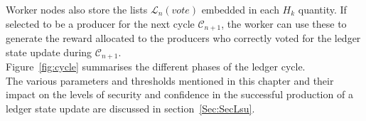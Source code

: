 Worker nodes also store the lists $\mathcal{L}_{n}(vote)$ embedded in each $H_k$ quantity. If selected to be a producer for the next cycle $\mathcal{C}_{n+1}$, the worker can use these to generate the reward allocated to the producers who correctly voted for the ledger state update during $\mathcal{C}_{n+1}$.\\

Figure~\ref{fig:cycle} summarises the different phases of the ledger cycle.\\

The various parameters and thresholds mentioned in this chapter and their impact on the levels of security and confidence in the successful production of a ledger state update are discussed in section~\ref{Sec:SecLsu}.
\newpage
\begin{landscape}
\begin{figure}

\end{figure}
\end{landscape}
